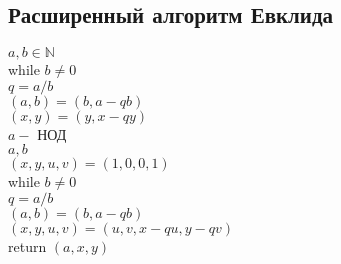 \documentclass[12pt]{article}
\begin{document}
\subsection{Расширенный алгоритм Евклида}
\noindent $a, b \in \mathbb{N}$\\
while $b \ne 0$\\
\indent $q = a / b$\\
\indent $(a, b) = (b, a - qb)$\\
\indent $(x, y) = (y, x - qy)$\\
\indent $a - $ НОД\\
\indent $a, b$\\
\indent $(x, y, u, v) = (1, 0, 0, 1)$\\
while $b \ne 0$\\
\indent $q = a / b$\\
\indent $(a, b) = (b, a - qb)$\\
\indent $(x, y, u, v) = (u, v, x - qu, y - qv)$\\
return $(a, x, y)$

\end{document}
